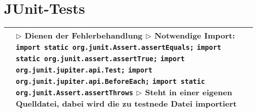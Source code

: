 \section{JUnit-Tests}


	\begin{table}[H]
	\label{JUnit-Tests}
	\begin{tabular}{ | p{4cm} p{13.5cm} | }


	\hline
	\makecell[l]{Struktur} & 
	\makecell[l]
	{
	$\rhd$ Dienen der Fehlerbehandlung \\
	$\rhd$ Notwendige Import: \\
	\hspace{0.5cm} \texttt{import static org.junit.Assert.assertEquals;} \\
	\hspace{0.5cm} \texttt{import static org.junit.assert.assertTrue;} \\
	\hspace{0.5cm} \texttt{import org.junit.jupiter.api.Test;} \\
	\hspace{0.5cm} \texttt{import org.junit.jupiter.api.BeforeEach;} \\
	\hspace{0.5cm} \texttt{import static org.junit.Assert.assertThrows} \\
	$\rhd$ Steht in einer eigenen Quelldatei, dabei wird die zu testnede Datei importiert \\
	} 	\\ \hline



\end{tabular}
\end{table}
